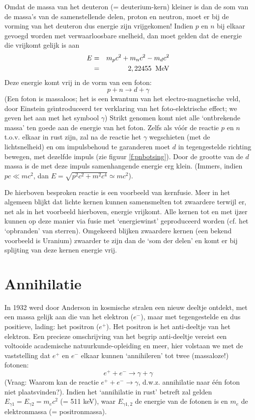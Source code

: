 Omdat de massa van het deuteron (= deuterium-kern) kleiner is 
dan de som van de massa's van
de samenstellende delen, proton en neutron, moet er bij
de vorming van het deuteron dus energie zijn vrijgekomen!
Indien $p$ en $n$ bij elkaar gevoegd worden met verwaarloosbare snelheid, dan
moet gelden dat de energie die vrijkomt gelijk is aan
\begin{eqnarray*}
E & = & m_{p}c^{2} + m_{n}c^{2} - m_{d}c^{2} \\
& = & 2,22455 \;\; {\rm MeV}
\end{eqnarray*}
Deze energie komt vrij in de vorm van een foton:
\begin{displaymath}
p + n \rightarrow d + \gamma
\end{displaymath}
(Een foton is massaloos; het is een kwantum van het electro-magnetische veld,
door Einstein ge\"{\i}ntroduceerd ter verklaring van het foto-elektrische 
effect; we geven het aan met het symbool $\gamma$)
Strikt genomen komt niet alle `ontbrekende massa' ten goede aan de energie
van het foton.
Zelfs als v\'{o}\'{o}r de reactie $p$ en $n$ t.o.v. elkaar in rust zijn, zal
na de reactie het $\gamma$ wegschieten (met de lichtsnelheid) en om
impulsbehoud te
garanderen moet $d$ in tegengestelde richting bewegen, met dezelfde impuls
(zie figuur \ref{f:pnbotsing}).
Door de grootte van de $d$ massa is de met deze impuls samenhangende energie
erg klein.
(Immers, indien $pc \ll mc^{2}$, dan $E = \sqrt{p^{2}c^{2} + m^{2}c^{4}} \simeq
mc^{2}$).

De hierboven besproken reactie is een voorbeeld van kernfusie.
Meer in het algemeen blijkt dat lichte kernen kunnen samensmelten tot
zwaardere terwijl er, net als in het voorbeeld hierboven, energie vrijkomt.
Alle kernen tot en met ijzer kunnen op deze manier via fusie met
`energiewinst' geproduceerd worden (cf. het `opbranden' van sterren).
Omgekeerd blijken zwaardere kernen (een bekend voorbeeld is Uranium) zwaarder
te zijn dan de `som der delen' en komt er bij splijting van deze kernen
energie vrij.

\section{Annihilatie}
In 1932 werd door Anderson in kosmische stralen een nieuw deeltje ontdekt,
met een massa gelijk aan die van het elektron ($e^{-}$), maar 
met tegengestelde en dus
positieve, lading: het positron ($e^{+}$).
Het positron is het anti-deeltje van het elektron. 
Een precieze omschrijving van het begrip anti-deeltje vereist een voltooide
academische natuurkunde-opleiding en meer, hier volstaan we met de
vaststelling dat $e^{+}$ en $e^{-}$ elkaar kunnen `annihileren' 
tot twee (massaloze!) fotonen:
\begin{displaymath}
e^{+}   + e^{-} \rightarrow \gamma + \gamma
\end{displaymath}
(Vraag: Waarom kan de reactie $e^{+} + e^{-} \rightarrow \gamma$, d.w.z.
annihilatie naar \'{e}\'{e}n foton niet plaatsvinden?).
Indien het `annihilatie in rust' betreft zal gelden $E_{\gamma 1} = E_{\gamma
2} = m_{e}c^{2}$ (= 511 keV), waar $E_{\gamma 1,2}$ de energie van de 
fotonen is en $m_{e}$
de elektronmassa (= positronmassa).

